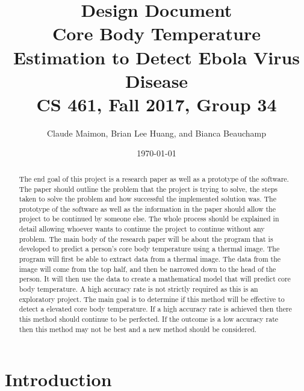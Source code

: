 \documentclass[onecolumn, draftclsnofoot,10pt, compsoc]{IEEEtran}
\title{%
  Design Document \\
  \vspace{0.4cm}
  \large Core Body Temperature Estimation to Detect Ebola Virus Disease \\
  \vspace{0.4cm}
  \large CS 461, Fall 2017, Group 34\\
    }
\author{Claude Maimon, Brian Lee Huang, and Bianca Beauchamp}
\date{\today}
\begin{document}
\maketitle

\begin{abstract}
	The end goal of this project is a research paper as well as a prototype of the software. The paper should outline the problem that the project is trying to solve, the steps taken to solve the problem and how successful the implemented solution was. The prototype of the software as well as the information in the paper should allow the project to be continued by someone else. The whole process should be explained in detail allowing whoever wants to continue the project to continue without any problem. The main body of the research paper will be about the program that is developed to predict a person's core body temperature using a thermal image. The program will first be able to extract data from a thermal image. The data from the image will come from the top half, and then be narrowed down to the head of the person. It will then use the data to create a mathematical model that will predict core body temperature. A high accuracy rate is not strictly required as this is an exploratory project. The main goal is to determine if this method will be effective to detect a elevated core body temperature. If a high accuracy rate is achieved then there this method should continue to be perfected. If the outcome is a low accuracy rate then this method may not be best and a new method should be considered.
\end{abstract}

\newpage

\tableofcontents
\newpage
\section{Introduction}
\end{document}
